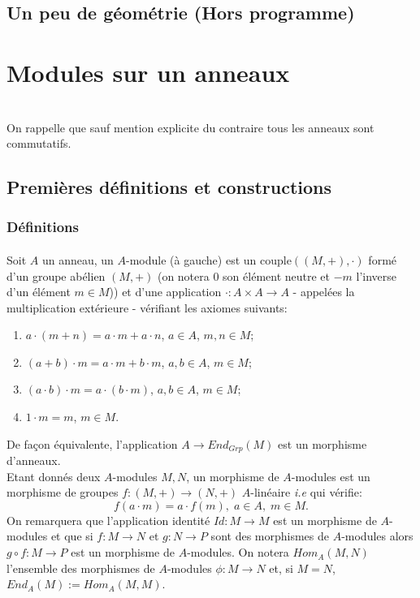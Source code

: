 \documentclass[a4paper, oneside, 12pt]{book}
\theoremstyle{definition} %
\begin{document}
 \chapter{Un peu de géométrie (Hors programme)}
 

 
 


 
\part{Modules sur un anneaux}
\textit{}\\
 On rappelle que sauf mention explicite du contraire tous les anneaux sont commutatifs.
\chapter{Premières définitions et constructions}
\section{Définitions}
\subsection{}Soit $A$ un anneau, un $A$-module (à gauche) est un couple$((M,+),\cdot)$ formé d'un groupe abélien  $(M,+)$ (on notera $0$ son élément neutre et $-m$ l'inverse d'un élément $m\in M$)) et d'une application $ \cdot :A\times A\rightarrow A$ - appelées la multiplication extérieure -  vérifiant les axiomes suivants:
\begin{enumerate} 
\item $a\cdot (m+n)=a\cdot m+a\cdot n $, $a\in A$, $m,n\in M$;
\item $(a+b)\cdot m=a\cdot m+b\cdot m$, $a,b\in A$, $m\in M$;
\item $(a\cdot b)\cdot m=a\cdot (b\cdot m)$, $a,b\in A$, $m\in M$;
\item $1\cdot m=m$, $m\in M$. \\
\end{enumerate}
De fa\c{c}on équivalente, l'application $A\rightarrow End_{Grp}(M)$ est un morphisme d'anneaux.\\

 Etant donnés deux  $A$-modules $M,N$, un morphisme de $A$-modules est un morphisme de groupes $f:(M,+)\rightarrow (N,+)$   $A$-linéaire \textit{i.e} qui vérifie:
  $$f(a\cdot m)=a\cdot f(m),\; a\in A,\; m\in M.$$ 
On remarquera que l'application identité $Id:M\rightarrow M$ est un morphisme de $A$-modules et que si $f:M\rightarrow N$ et $g:N\rightarrow P$ sont des morphismes de $A$-modules alors $g\circ f:M\rightarrow P$ est un morphisme de $A$-modules. On notera $Hom_A(M,N)$ l'ensemble des morphismes de $A$-modules $\phi:M\rightarrow N$ et, si $M=N$, $End_A(M):=Hom_A(M,M)$. \\
\end{document}
